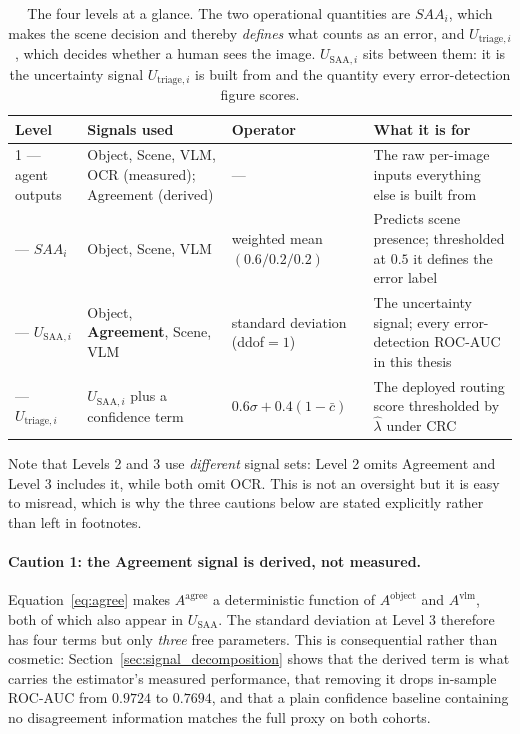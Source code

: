 \documentclass[12pt,a4paper]{report}
\begin{document}
\begin{table}[!htbp]
\centering
\caption[The four levels at a glance]{The four levels at a glance. The two operational quantities are $SAA_i$, which makes the scene decision and thereby \emph{defines} what counts as an error, and $U_{\text{triage},i}$, which decides whether a human sees the image. $U_{\text{SAA},i}$ sits between them: it is the uncertainty signal $U_{\text{triage},i}$ is built from and the quantity every error-detection figure scores.}
\label{tab:saa_levels}
\small
\begin{tabular}{p{1.6cm} p{3.5cm} p{2.3cm} p{5.4cm}}
\toprule
\textbf{Level} & \textbf{Signals used} & \textbf{Operator} & \textbf{What it is for} \\
\midrule
1 --- agent outputs & Object, Scene, VLM, OCR (measured); Agreement (derived) & --- & The raw per-image inputs everything else is built from \\
\addlinespace
2 --- $SAA_i$ & Object, Scene, VLM & weighted mean $(0.6/0.2/0.2)$ & Predicts scene presence; thresholded at $0.5$ it defines the error label \\
\addlinespace
3 --- $U_{\text{SAA},i}$ & Object, \textbf{Agreement}, Scene, VLM & standard deviation (ddof$=1$) & The uncertainty signal; every error-detection ROC-AUC in this thesis \\
\addlinespace
4 --- $U_{\text{triage},i}$ & $U_{\text{SAA},i}$ plus a confidence term & $0.6\sigma + 0.4(1-\bar{c})$ & The deployed routing score thresholded by $\hat\lambda$ under CRC \\
\bottomrule
\end{tabular}
\end{table}

Note that Levels 2 and 3 use \emph{different} signal sets: Level 2 omits Agreement and Level 3 includes it, while both omit OCR. This is not an oversight but it is easy to misread, which is why the three cautions below are stated explicitly rather than left in footnotes.

\paragraph{Caution 1: the Agreement signal is derived, not measured.}
Equation~\ref{eq:agree} makes $A^{\text{agree}}$ a deterministic function of $A^{\text{object}}$ and $A^{\text{vlm}}$, both of which also appear in $U_{\text{SAA}}$. The standard deviation at Level 3 therefore has four terms but only \emph{three} free parameters. This is consequential rather than cosmetic: Section~\ref{sec:signal_decomposition} shows that the derived term is what carries the estimator's measured performance, that removing it drops in-sample ROC-AUC from $0.9724$ to $0.7694$, and that a plain confidence baseline containing no disagreement information matches the full proxy on both cohorts.
\end{document}
